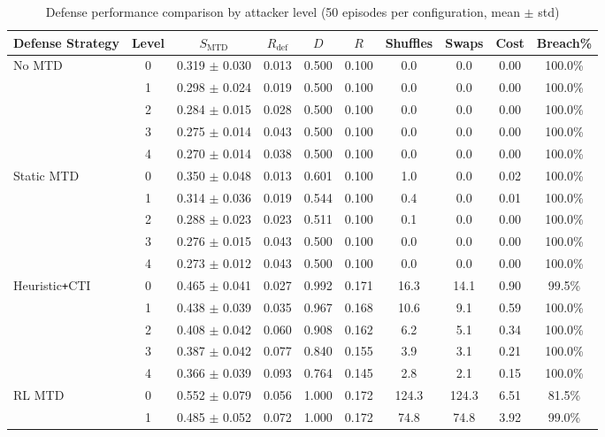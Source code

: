 \begin{table}[htbp]
\centering
\caption{Defense performance comparison by attacker level (50 episodes per configuration, mean $\pm$ std)}
\label{tab:comparison_results}
\begin{tabular}{@{}lccccccccc@{}}
\toprule
\textbf{Defense Strategy} & \textbf{Level} & $S_{\text{MTD}}$ & $R_{\text{def}}$ & $D$ & $R$ & Shuffles & Swaps & Cost & Breach\% \\
\midrule
\multirow{5}{*}{No MTD}
& 0 & 0.319 $\pm$ 0.030 & 0.013 & 0.500 & 0.100 & 0.0 & 0.0 & 0.00 & 100.0\% \\
& 1 & 0.298 $\pm$ 0.024 & 0.019 & 0.500 & 0.100 & 0.0 & 0.0 & 0.00 & 100.0\% \\
& 2 & 0.284 $\pm$ 0.015 & 0.028 & 0.500 & 0.100 & 0.0 & 0.0 & 0.00 & 100.0\% \\
& 3 & 0.275 $\pm$ 0.014 & 0.043 & 0.500 & 0.100 & 0.0 & 0.0 & 0.00 & 100.0\% \\
& 4 & 0.270 $\pm$ 0.014 & 0.038 & 0.500 & 0.100 & 0.0 & 0.0 & 0.00 & 100.0\% \\
\midrule
\multirow{5}{*}{Static MTD}
& 0 & 0.350 $\pm$ 0.048 & 0.013 & 0.601 & 0.100 & 1.0 & 0.0 & 0.02 & 100.0\% \\
& 1 & 0.314 $\pm$ 0.036 & 0.019 & 0.544 & 0.100 & 0.4 & 0.0 & 0.01 & 100.0\% \\
& 2 & 0.288 $\pm$ 0.023 & 0.023 & 0.511 & 0.100 & 0.1 & 0.0 & 0.00 & 100.0\% \\
& 3 & 0.276 $\pm$ 0.015 & 0.043 & 0.500 & 0.100 & 0.0 & 0.0 & 0.00 & 100.0\% \\
& 4 & 0.273 $\pm$ 0.012 & 0.043 & 0.500 & 0.100 & 0.0 & 0.0 & 0.00 & 100.0\% \\
\midrule
\multirow{5}{*}{Heuristic\texttt{+}CTI}
& 0 & 0.465 $\pm$ 0.041 & 0.027 & 0.992 & 0.171 & 16.3 & 14.1 & 0.90 & 99.5\% \\
& 1 & 0.438 $\pm$ 0.039 & 0.035 & 0.967 & 0.168 & 10.6 & 9.1 & 0.59 & 100.0\% \\
& 2 & 0.408 $\pm$ 0.042 & 0.060 & 0.908 & 0.162 & 6.2 & 5.1 & 0.34 & 100.0\% \\
& 3 & 0.387 $\pm$ 0.042 & 0.077 & 0.840 & 0.155 & 3.9 & 3.1 & 0.21 & 100.0\% \\
& 4 & 0.366 $\pm$ 0.039 & 0.093 & 0.764 & 0.145 & 2.8 & 2.1 & 0.15 & 100.0\% \\
\midrule
\multirow{5}{*}{RL MTD}
& 0 & 0.552 $\pm$ 0.079 & 0.056 & 1.000 & 0.172 & 124.3 & 124.3 & 6.51 & 81.5\% \\
& 1 & 0.485 $\pm$ 0.052 & 0.072 & 1.000 & 0.172 & 74.8 & 74.8 & 3.92 & 99.0\% \\

\end{tabular}
\end{table}
